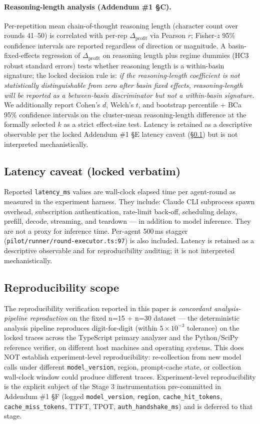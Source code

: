 \paragraph{Reasoning-length analysis (Addendum \#1 \S C).}
Per-repetition mean chain-of-thought reasoning length (character count over rounds 41--50) is correlated with per-rep $\Delta_{\text{profit}}$ via Pearson $r$; Fisher-$z$ 95\% confidence intervals are reported regardless of direction or magnitude. A basin-fixed-effects regression of $\Delta_{\text{profit}}$ on reasoning length plus regime dummies (HC3 robust standard errors) tests whether reasoning length is a within-basin signature; the locked decision rule is: \emph{if the reasoning-length coefficient is not statistically distinguishable from zero after basin fixed effects, reasoning-length will be reported as a between-basin discriminator but not a within-basin signature.} We additionally report Cohen's $d$, Welch's $t$, and bootstrap percentile + BCa 95\% confidence intervals on the cluster-mean reasoning-length difference at the formally selected $k$ as a strict effect-size test. Latency is retained as a descriptive observable per the locked Addendum \#1 \S E latency caveat (\S\ref{sec:methods-latency}) but is not interpreted mechanistically.

\subsection{Latency caveat (locked verbatim)}
\label{sec:methods-latency}

Reported \texttt{latency\_ms} values are wall-clock elapsed time per agent-round as measured in the experiment harness. They include: Claude CLI subprocess spawn overhead, subscription authentication, rate-limit back-off, scheduling delays, prefill, decode, streaming, and teardown --- in addition to model inference. They are not a proxy for inference time. Per-agent 500\,ms stagger (\texttt{pilot/runner/round-executor.ts:97}) is also included. Latency is retained as a descriptive observable and for reproducibility auditing; it is not interpreted mechanistically.

\subsection{Reproducibility scope}
\label{sec:methods-repro}

The reproducibility verification reported in this paper is \emph{concordant analysis-pipeline reproduction} on the fixed n=15 + n=30 dataset --- the deterministic analysis pipeline reproduces digit-for-digit (within $5 \times 10^{-3}$ tolerance) on the locked traces across the TypeScript primary analyzer and the Python/SciPy reference verifier, on different host machines and operating systems. This does NOT establish experiment-level reproducibility: re-collection from new model calls under different \texttt{model\_version}, region, prompt-cache state, or collection wall-clock window could produce different traces. Experiment-level reproducibility is the explicit subject of the Stage 3 instrumentation pre-committed in Addendum \#1 \S F (logged \texttt{model\_version}, \texttt{region}, \texttt{cache\_hit\_tokens}, \texttt{cache\_miss\_tokens}, TTFT, TPOT, \texttt{auth\_handshake\_ms}) and is deferred to that stage.
